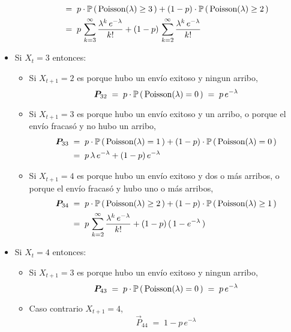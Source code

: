 \documentclass[ a4paper, twoside, 11pt]{article}
\begin{document}
\begin{problem}
\begin{itemize}
\begin{itemize}
\begin{align*}
& = \; p \cdot \mathbb{P} \, ( \, \text{Poisson}(\lambda) \geq 3 \, ) +
(1-p) \cdot \mathbb{P} \, ( \, \text{Poisson}(\lambda) \geq 2 \, ) \\
& = \;
p \, \sum_{k=3}^{\infty} \frac{\lambda^k \, e^{-\lambda}}{k!} 
+ (1-p) \, \sum_{k=2}^{\infty} \frac{\lambda^k \, e^{-\lambda}}{k!} 
\end{align*}
\end{itemize}
\item Si $X_t = 3$ entonces: 
\begin{itemize}
\item Si $X_{t+1} = 2$ es porque hubo un env\'io exitoso y ningun arribo, \iec 
\[
{\boldsymbol{P}}_{32} \; = \;
p \cdot \mathbb{P} \, ( \, \text{Poisson}(\lambda) = 0 \, ) \; = \;
p \, e^{-\lambda}
\]
\item Si $X_{t+1} = 3$ es porque hubo un env\'io exitoso y un arribo, o porque el env\'io fracas\'o y no hubo un arribo, \iec 
\begin{align*}
{\boldsymbol{P}}_{33} \; 
& = \; p \cdot \mathbb{P} \, ( \, \text{Poisson}(\lambda) = 1 \, ) +
(1-p) \cdot \mathbb{P} \, ( \, \text{Poisson}(\lambda) = 0 \, ) \\
& = \; p \, \lambda \, e^{-\lambda} + (1-p) \, e^{-\lambda}
\end{align*}
\item Si $X_{t+1} = 4$ es porque hubo un env\'io exitoso y dos o m\'as arribos, o porque el env\'io fracas\'o y hubo uno o m\'as arribos, \iec 
\begin{align*}
{\boldsymbol{P}}_{34} \; 
& = \; p \cdot \mathbb{P} \, ( \, \text{Poisson}(\lambda) \geq 2 \, ) +
(1-p) \cdot \mathbb{P} \, ( \, \text{Poisson}(\lambda) \geq 1 \, ) \\
& = \; 
p \, \sum_{k=2}^{\infty} \frac{\lambda^k \, e^{-\lambda}}{k!} 
+ (1-p) \, ( \, 1 - e^{-\lambda} \, )
\end{align*}
\end{itemize}
\item Si $X_t = 4$ entonces: 
\begin{itemize}
\item Si $X_{t+1} = 3$ es porque hubo un env\'io exitoso y ningun arribo, \iec 
\[
{\boldsymbol{P}}_{43} \; = \;
p \cdot \mathbb{P} \, ( \, \text{Poisson}(\lambda) = 0 \, ) \; = \;
p \, e^{-\lambda}
\]
\item Caso contrario $X_{t+1} = 4$, \iec 
\[
\vec{P}_{44} \; = \; 1 - p \, e^{-\lambda}
\]
\end{itemize}

\end{itemize}

\end{problem}
\vspace{\baselineskip}
\end{document}
